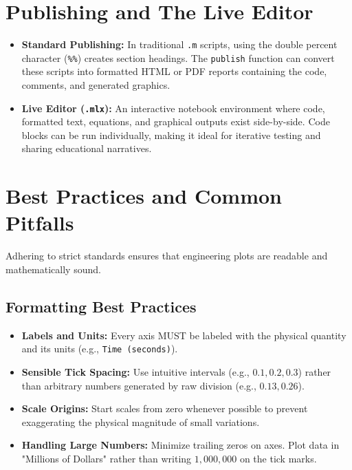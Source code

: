 \section{Publishing and The Live Editor}
\begin{itemize}
    \item \textbf{Standard Publishing:} In traditional \texttt{.m} scripts, using the double percent character (\texttt{\%\%}) creates section headings. The \texttt{publish} function can convert these scripts into formatted HTML or PDF reports containing the code, comments, and generated graphics.
    \item \textbf{Live Editor (\texttt{.mlx}):} An interactive notebook environment where code, formatted text, equations, and graphical outputs exist side-by-side. Code blocks can be run individually, making it ideal for iterative testing and sharing educational narratives.
\end{itemize}

\section{Best Practices and Common Pitfalls}
Adhering to strict standards ensures that engineering plots are readable and mathematically sound.

\subsection{Formatting Best Practices}
\begin{itemize}
    \item \textbf{Labels and Units:} Every axis MUST be labeled with the physical quantity and its units (e.g., \texttt{Time (seconds)}).
    \item \textbf{Sensible Tick Spacing:} Use intuitive intervals (e.g., $0.1, 0.2, 0.3$) rather than arbitrary numbers generated by raw division (e.g., $0.13, 0.26$).
    \item \textbf{Scale Origins:} Start scales from zero whenever possible to prevent exaggerating the physical magnitude of small variations.
    \item \textbf{Handling Large Numbers:} Minimize trailing zeros on axes. Plot data in "Millions of Dollars" rather than writing $1,000,000$ on the tick marks.
\end{itemize}

